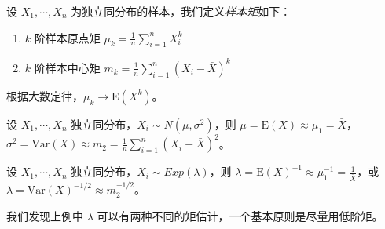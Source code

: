 \documentclass[../main.tex]{subfiles}
\begin{document}
设 $X_1,\cdots,X_n$ 为独立同分布的样本，我们定义\emph{样本矩}如下：
\begin{enumerate}
    \item $k$ 阶样本原点矩 $\mu_k=\frac1n\sum_{i=1}^nX_i^k$
    \item $k$ 阶样本中心矩 $m_k=\frac1n\sum_{i=1}^n(X_i-\bar X)^k$
\end{enumerate}

根据大数定律，$\mu_k\rightarrow\mathrm E(X^k)$。

\begin{example}
    设 $X_1,\cdots,X_n$ 独立同分布，$X_i\sim N(\mu,\sigma^2)$，则 $\mu=\mathrm E(X)\approx \mu_1=\bar X$，$\sigma^2=\mathrm{Var}(X)\approx m_2=\frac1n\sum_{i=1}^n(X_i-\bar X)^2$。
\end{example}

\begin{example}
    设 $X_1,\cdots,X_n$ 独立同分布，$X_i\sim Exp(\lambda)$，则 $\lambda=\mathrm E(X)^{-1}\approx \mu_1^{-1}=\frac1{\bar X}$，或 $\lambda=\mathrm{Var}(X)^{-1/2}\approx m_2^{-1/2}$。
\end{example}

我们发现上例中 $\lambda$ 可以有两种不同的矩估计，一个基本原则是尽量用低阶矩。


\end{document}
